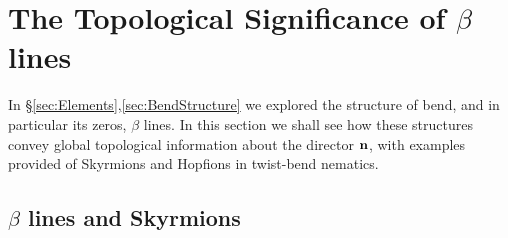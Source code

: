 {\section{The Topological Significance of $\beta$ lines}
\label{sec:TopologicalSignificance}

In \S \ref{sec:Elements},\ref{sec:BendStructure} we explored the structure of bend, and in particular its zeros, $\beta$ lines. In this section we shall see how these structures convey global topological information about the director $\mathbf{n}$, with examples provided of Skyrmions and Hopfions in twist-bend nematics.  

\subsection{$\beta$ lines and Skyrmions}

}
